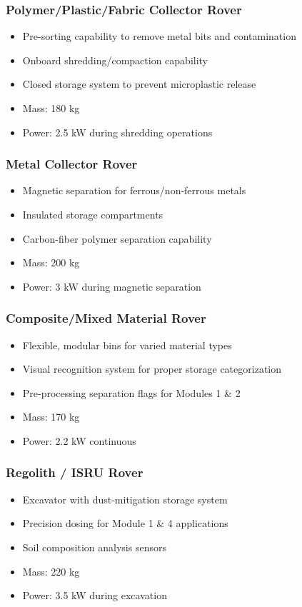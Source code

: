 \documentclass[12pt, a4paper]{article}
\begin{document}
\subsubsection{Polymer/Plastic/Fabric Collector Rover}
\begin{itemize}
    \item Pre-sorting capability to remove metal bits and contamination
    \item Onboard shredding/compaction capability
    \item Closed storage system to prevent microplastic release
    \item Mass: 180 kg
    \item Power: 2.5 kW during shredding operations
\end{itemize}

\subsubsection{Metal Collector Rover}
\begin{itemize}
    \item Magnetic separation for ferrous/non-ferrous metals
    \item Insulated storage compartments
    \item Carbon-fiber polymer separation capability
    \item Mass: 200 kg
    \item Power: 3 kW during magnetic separation
\end{itemize}

\subsubsection{Composite/Mixed Material Rover}
\begin{itemize}
    \item Flexible, modular bins for varied material types
    \item Visual recognition system for proper storage categorization
    \item Pre-processing separation flags for Modules 1 \& 2
    \item Mass: 170 kg
    \item Power: 2.2 kW continuous
\end{itemize}

\subsubsection{Regolith / ISRU Rover}
\begin{itemize}
    \item Excavator with dust-mitigation storage system
    \item Precision dosing for Module 1 \& 4 applications
    \item Soil composition analysis sensors
    \item Mass: 220 kg
    \item Power: 3.5 kW during excavation
\end{itemize}
\end{document}
